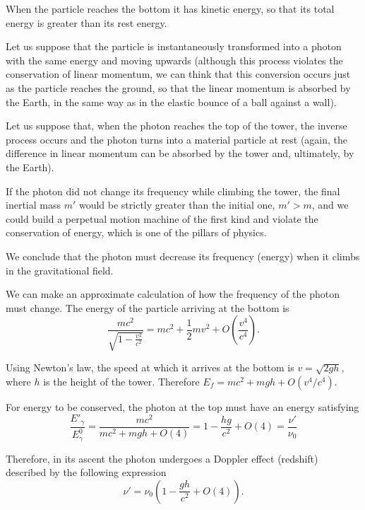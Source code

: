 \begin{points}
\item When the particle reaches the bottom it has kinetic energy, so that its total energy is greater than its rest energy.

\item Let us suppose that the particle is instantaneously transformed into a photon with the same energy and moving upwards (although this process violates the conservation of linear momentum, we can think that this conversion occurs just as the particle reaches the ground, so that the linear momentum is absorbed by the Earth, in the same way as in the elastic bounce of a ball against a wall).

\item Let us suppose that, when the photon reaches the top of the tower, the inverse process occurs and the photon turns into a material particle at rest (again, the difference in linear momentum can be absorbed by the tower and, ultimately, by the Earth).

\item If the photon did not change its frequency while climbing the tower, the final inertial mass $m'$ would be strictly greater than the initial one, $m'>m$, and we could build a perpetual motion machine of the first kind and violate the conservation of energy, which is one of the pillars of physics.

\item We conclude that the photon must decrease its frequency (energy) when it climbs in the gravitational field.

\item We can make an approximate calculation of how the frequency of the photon must change. The energy of the particle arriving at the bottom is
\[
  \frac{mc^2}{\sqrt{1-\frac{v^2}{c^2}}}=mc^2+\frac12mv^2+O\left(\frac{v^4}{c^4}\right).
\]

\item Using Newton's law, the speed at which it arrives at the bottom is $v=\sqrt{2gh}$, where $h$ is the height of the tower. Therefore $E_f=mc^2+mgh+O(v^4/c^4)$.

\item For energy to be conserved, the photon at the top must have an energy satisfying
\[
  \frac{E'_\gamma}{E^0_\gamma}=\frac{mc^2}{mc^2+mgh+O(4)}=1-\frac{hg}{c^2}+O(4)=\frac{\nu'}{\nu_0}
\]

\item Therefore, in its ascent the photon undergoes a Doppler effect (redshift) described by the following expression
\[
  \nu'=\nu_0\left(1-\frac{gh}{c^2}+O(4)\right).
\]


\end{points}
